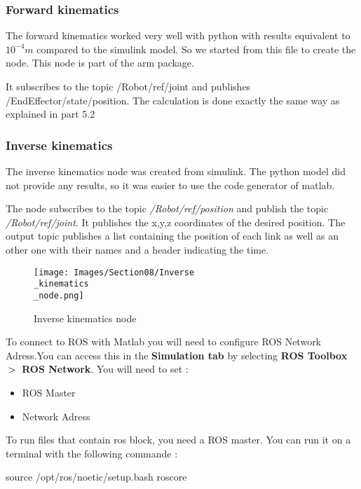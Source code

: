 \subsubsection{Forward kinematics}

The forward kinematics worked very well with python with results equivalent to $10^{-4}m$ compared to the simulink model. So we started from this file to create the node. This node is part of the arm package. 

\bigbreak
It subscribes to the topic /Robot/ref/joint and publishes /EndEffector/state/position. The calculation is done exactly the same way as explained in part 5.2

\subsubsection{Inverse kinematics}

The inverse kinematics node was created from simulink. The python model did not provide any results, so it was easier to use the code generator of matlab.

\bigbreak
The node subscribes to the topic \textit{/Robot/ref/position} and publish the topic \textit{/Robot/ref/joint}. It publishes the x,y,z coordinates of the desired position. The output topic publishes a list containing the position of each link as well as an other one with their names and a header indicating the time.
\bigbreak
\begin{figure}[ht]
    \centering
    \texttt{[image: Images/Section08/Inverse\\\_kinematics\\\_node.png]}
    \caption{Inverse kinematics node}
    \label{fig:InverseKinNode}
\end{figure}
\FloatBarrier

\bigbreak
To connect to ROS with Matlab you will need to configure ROS Network Adress.You can access this in the \textbf{Simulation tab} by selecting \textbf{ROS Toolbox} $\bg$ \textbf{ROS Network}. You will need to set :
\begin{multicols}{2}
    \begin{itemize}[noitemsep]
        \item ROS Master
        \item Network Adress
    \end{itemize}
\end{multicols}

\bigbreak
To run files that contain ros block, you need a ROS master. You can run it on a terminal with the following commande :
\begin{commandshell}
    source /opt/ros/noetic/setup.bash
    roscore
\end{commandshell} 

